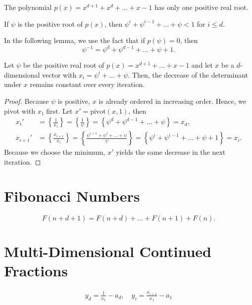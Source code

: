 \documentclass[english,version-2020-11]{uzl-thesis}
\begin{document}
\begin{lemma}
  The polynomial $p(x) = x^{d+1} + x^d + \dots + x - 1$ has only one positive real root.
\end{lemma}

\begin{corollary}
  If $ψ$ is the positive root of $p(x)$, then $ψ^i + ψ^{i-1} + \dots + ψ < 1$ for $i ≤ d$.
\end{corollary}

In the following lemma, we use the fact that if $p(ψ) = 0$, then
\[
  ψ^{-1} = ψ^d + ψ^{d-1} + \dots + ψ + 1.
\]

\begin{lemma}
  Let $ψ$ be the positive real root of $p(x) = x^{d+1} + \dots + x - 1$
  and let $x$ be a $d$-dimensional vector with $x_i = ψ^i + \dots + ψ$.
  Then, the decrease of the determinant under $x$ remains constant over every iteration.
\end{lemma}

\begin{proof}
  Because $ψ$ is positive, $x$ is already ordered in increasing order.
  Hence, we pivot with $x₁$ first.
  Let $x' = \mathrm{pivot}(x, 1)$,
  then
  \begin{align*}
    x₁'
    & = \left\{\frac{1}{x₁}\right\}
    = \left\{\frac1{ψ}\right\}
    = \left\{ψ^d + ψ^{d-1} + \dots + ψ\right\} = x_d, \\
    x_{i+1}'
    & = \left\{\frac{x_{i+1}}{x₁}\right\}
    = \left\{\frac{ψ^{i+1} + ψ^i + \dots + ψ}{ψ}\right\}
    = \left\{ψ^i + ψ^{i-1} + \dots + ψ + 1\right\}
    = x_i.
  \end{align*}
  Because we choose the minimum, $x'$ yields the same decrease in the next iteration.
\end{proof}

\section{Fibonacci Numbers}

\[
  F(n + d + 1) = F(n + d) + \dots + F(n + 1) + F(n).
\]

\section{Multi-Dimensional Continued Fractions}

\begin{align*}
  y_d = \frac{1}{x_1} - a_d,
  \quad y_i = \frac{x_{i+1}}{x_1} - a_1
\end{align*}
\end{document}
